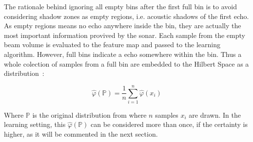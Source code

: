 The rationale behind ignoring all empty bins after the first full bin is to
avoid considering shadow zones as empty regions, i.e. acoustic shadows of the
first echo. As empty regions means no echo anywhere inside the bin, they are
actually the most important information provived by the sonar. Each sample from
the empty beam volume is evaluated to the feature map and passed to the learning
algorithm. However, full bins indicate a echo somewhere within the bin. Thus
a whole colection of samples from a full bin are embedded to the Hilbert Space
as a distribution~\cite{song2013kernel,ramos2016hilbert}:

\begin{equation}
\label{eq:embedding}
\hat{\varphi}(\mathbb{P})=\frac{1}{n}\sum_{i=1}^n\hat{\varphi}(x_i)
\end{equation}

Where $\mathbb{P}$ is the original distribution from where $n$ samples $x_i$ are
drawn. In the learning setting, this $\hat{\varphi}(\mathbb{P})$ can be
considered more than once, if the certainty is higher, as it will be commented
in the next section.
